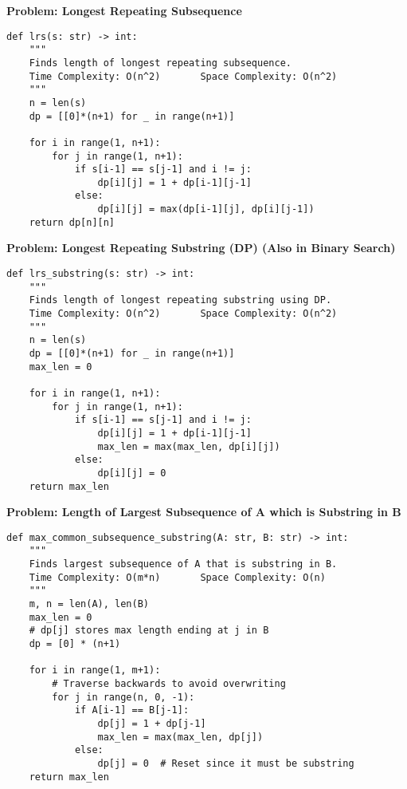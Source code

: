 \noindent\textbf{Problem: Longest Repeating Subsequence}
\begin{verbatim}
def lrs(s: str) -> int:
    """
    Finds length of longest repeating subsequence.
    Time Complexity: O(n^2)       Space Complexity: O(n^2)
    """
    n = len(s)
    dp = [[0]*(n+1) for _ in range(n+1)]
    
    for i in range(1, n+1):
        for j in range(1, n+1):
            if s[i-1] == s[j-1] and i != j:
                dp[i][j] = 1 + dp[i-1][j-1]
            else:
                dp[i][j] = max(dp[i-1][j], dp[i][j-1])
    return dp[n][n]
\end{verbatim}

\noindent\textbf{Problem: Longest Repeating Substring (DP) (Also in Binary Search)}
\begin{verbatim}
def lrs_substring(s: str) -> int:
    """
    Finds length of longest repeating substring using DP.
    Time Complexity: O(n^2)       Space Complexity: O(n^2)
    """
    n = len(s)
    dp = [[0]*(n+1) for _ in range(n+1)]
    max_len = 0
    
    for i in range(1, n+1):
        for j in range(1, n+1):
            if s[i-1] == s[j-1] and i != j:
                dp[i][j] = 1 + dp[i-1][j-1]
                max_len = max(max_len, dp[i][j])
            else:
                dp[i][j] = 0
    return max_len
\end{verbatim}

\noindent\textbf{Problem: Length of Largest Subsequence of A which is Substring in B}
\begin{verbatim}
def max_common_subsequence_substring(A: str, B: str) -> int:
    """
    Finds largest subsequence of A that is substring in B.
    Time Complexity: O(m*n)       Space Complexity: O(n)
    """
    m, n = len(A), len(B)
    max_len = 0
    # dp[j] stores max length ending at j in B
    dp = [0] * (n+1)
    
    for i in range(1, m+1):
        # Traverse backwards to avoid overwriting
        for j in range(n, 0, -1):
            if A[i-1] == B[j-1]:
                dp[j] = 1 + dp[j-1]
                max_len = max(max_len, dp[j])
            else:
                dp[j] = 0  # Reset since it must be substring
    return max_len
\end{verbatim}

